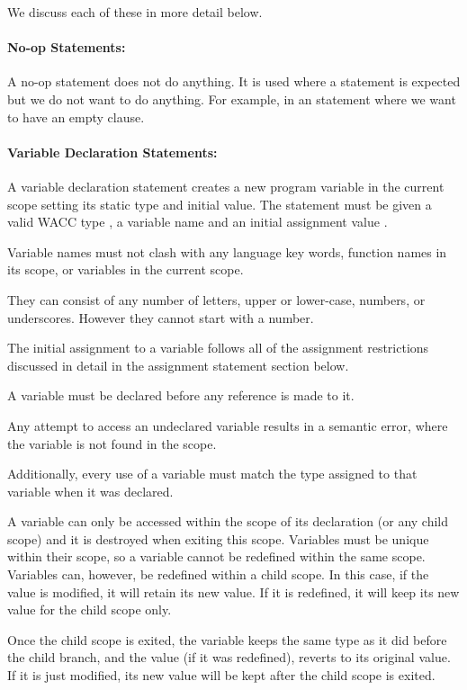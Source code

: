 \documentclass[a4paper]{article}
\theoremstyle{definition}
\begin{document}
We discuss each of these in more detail below.

\paragraph{No-op Statements:}
A no-op statement  does not do anything. 
It is used where a statement is expected but we do not want to do anything. 
For example, in an  statement where we want to have an empty  clause.

\paragraph{Variable Declaration Statements:}
A variable declaration statement creates a new program variable in the current scope setting its static type and initial value.
The statement must be given a valid WACC type , a variable name  and an initial assignment value .

Variable names must not clash with any language key words, function names in its scope, or variables in the current scope.

They can consist of any number of letters, upper or lower-case, numbers, or underscores. However they cannot start with a number.

The initial assignment to a variable follows all of the assignment restrictions discussed in detail in the assignment statement section below.

A variable must be declared before any reference is made to it. 

Any attempt to access an undeclared variable results in a semantic error, where the variable is not found in the scope.

Additionally, every use of a variable must match the type assigned to that variable when it was declared.

A variable can only be accessed within the scope of its declaration (or any child scope) and it is destroyed when exiting this scope.
Variables must be unique within their scope, so a variable cannot be redefined within the same scope.
Variables can, however, be redefined within a child scope.
In this case, if the value is modified, it will retain its new value. If it is redefined, it will keep its new value for the child scope
only.

Once the child scope is exited, the variable keeps the same type as it did before the child branch, and the value (if it was redefined), reverts
to its original value. If it is just modified, its new value will be kept after the child scope is exited.
\end{document}
